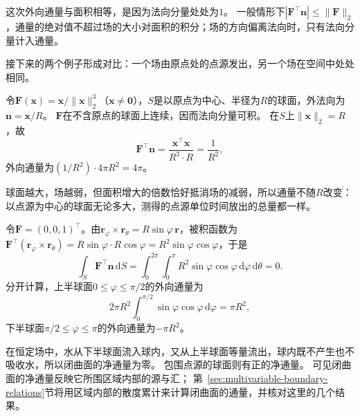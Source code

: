 这次外向通量与面积相等，是因为法向分量处处为$1$。
一般情形下$|\bm F^\top\bm n|\leq\lVert\bm F\rVert_2$，通量的绝对值不超过场的大小对面积的积分；场的方向偏离法向时，只有法向分量计入通量。

接下来的两个例子形成对比：一个场由原点处的点源发出，另一个场在空间中处处相同。

\begin{example}[点源场的通量与半径无关]
\label{ex:analysis-point-source-sphere-flux}
令$\bm F(\bm x)=\bm x/\lVert\bm x\rVert_2^3$（$\bm x\neq\bm0$），$S$是以原点为中心、半径为$R$的球面，外法向为$\bm n=\bm x/R$。
$\bm F$在不含原点的球面上连续，因而法向分量可积。
在$S$上$\lVert\bm x\rVert_2=R$，故
\[
 \bm F^\top\bm n=\frac{\bm x^\top\bm x}{R^3\cdot R}=\frac1{R^2},
\]
外向通量为$(1/R^2)\cdot4\pi R^2=4\pi$。
\end{example}

球面越大，场越弱，但面积增大的倍数恰好抵消场的减弱，所以通量不随$R$改变：
以点源为中心的球面无论多大，测得的点源单位时间放出的总量都一样。

\begin{example}[恒定场穿过球面的净通量为零]
\label{ex:analysis-constant-field-sphere-flux}
令$\bm F=(0,0,1)^\top$。由$\bm r_\varphi\times\bm r_\theta=R\sin\varphi\,\bm r$，被积函数为
$\bm F^\top(\bm r_\varphi\times\bm r_\theta)=R\sin\varphi\cdot R\cos\varphi=R^2\sin\varphi\cos\varphi$，于是
\[
 \int_S\bm F^\top\bm n\,\mathrm dS
 =\int_0^{2\pi}\int_0^\pi R^2\sin\varphi\cos\varphi\,\mathrm d\varphi\,\mathrm d\theta=0.
\]
分开计算，上半球面$0\leq\varphi\leq\pi/2$的外向通量为
\[
 2\pi R^2\int_0^{\pi/2}\sin\varphi\cos\varphi\,\mathrm d\varphi=\pi R^2,
\]
下半球面$\pi/2\leq\varphi\leq\pi$的外向通量为$-\pi R^2$。
\end{example}

在恒定场中，水从下半球面流入球内，又从上半球面等量流出，球内既不产生也不吸收水，所以闭曲面的净通量为零。
包围点源的球面则有正的净通量。
可见闭曲面的净通量反映它所围区域内部的源与汇；
第~\ref{sec:multivariable-boundary-relations}节将用区域内部的散度累计来计算闭曲面的通量，并核对这里的几个结果。

\FloatBarrier
